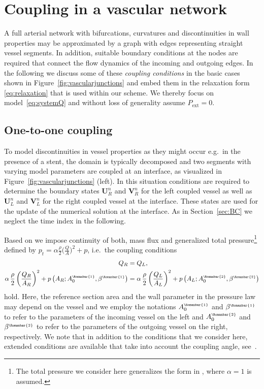 \documentclass[a4paper,11pt]{article}
\newcommand{\rmn}[1]{\text{\tiny \Romanbar{#1}}}
\begin{document}
\section{Coupling in a vascular network}\label{sec:cpl}
A full arterial network with bifurcations, curvatures and discontinuities in wall properties may be approximated by a graph with edges representing straight vessel segments. In addition, suitable boundary conditions at the nodes are required that connect the flow dynamics of the incoming and outgoing edges. In the following we discuss some of these \emph{coupling conditions} in the basic cases shown in Figure~\ref{fig:vascularjunctions} and embed them in the relaxation form \eqref{eq:relaxation} that is used within our scheme. We thereby focus on model~\eqref{eq:systemQ} and without loss of generality assume $P_{\text{ext}}=0$.

\subsection{One-to-one coupling}\label{sec:onetoone}
To model discontinuities in vessel properties as they might occur e.g.\ in the presence of a stent, the domain is typically decomposed and two segments with varying model parameters are coupled at an interface, as visualized in Figure~\ref{fig:vascularjunctions} (left). In this situation conditions are required to determine the boundary states $\mathbf U_R^n$ and $\mathbf V_R^n$ for the left coupled vessel as well as $\mathbf U_L^n$ and $\mathbf V_L^n$ for the right coupled vessel at the interface. These states are used for the update of the numerical solution at the interface. As in Section~\ref{sec:BC} we neglect the time index in the following.

Based on \cite{formaggia2003} we impose continuity of both, mass flux and generalized total pressure\footnote{The total pressure we consider here generalizes the form in \cite{formaggia2003}, where $\alpha=1$ is assumed.} defined by $p_t = \alpha \frac{\rho}{2} \bigl( \frac{Q}{A} \bigr)^2 + p$, i.e.\ the coupling conditions 
\begin{align}
	Q_R &= Q_L, \label{eq:contQ} \\
  \alpha \, \frac{\rho}{2} \left( \frac{Q_R}{A_R} \right)^2 + p\left( A_R; A_0^{\rmn{1}}, \beta^{\rmn{1}} \right) &= \alpha \, \frac{\rho}{2} \left( \frac{Q_L}{A_L} \right)^2 + p\left( A_L; A_0^{\rmn{2}}, \beta^{\rmn{2}} \right) \label{eq:contpt}
\end{align}
hold. Here, the reference section area and the wall parameter in the pressure law may depend on the vessel and we employ the notations $A_0^{\rmn{1}}$ and $\beta^{\rmn{1}}$ to refer to the parameters of the incoming vessel on the left and $A_0^{\rmn{2}}$ and $\beta^{\rmn{2}}$ to refer to the parameters of the outgoing vessel on the right, respectively. We note that in addition to the conditions that we consider here, extended conditions are available that take into account the coupling angle, see~\cite{formaggia2003}.
\end{document}

